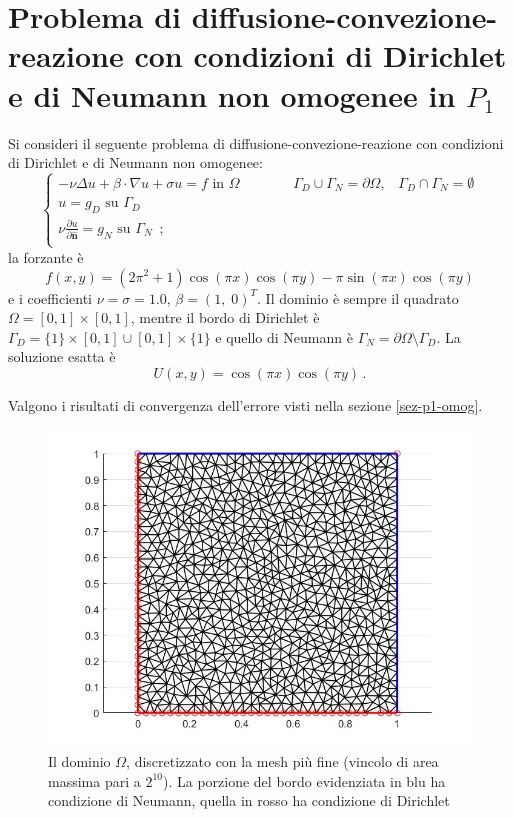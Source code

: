 \documentclass[%
	corpo=11pt,
    twoside,
    stile=classica,
    oldstyle,
    tipotesi=custom,
    greek,
    evenboxes,
]{toptesi}
\begin{document}
\section[Diffusione-convezione-reazione con condizioni di Dirichlet e  Neumann non omogenee in $P_1$]{Problema di diffusione-convezione-reazione con condizioni di Dirichlet e di Neumann non omogenee in $P_1$}

Si consideri il seguente problema di  diffusione-convezione-reazione con condizioni di Dirichlet e di Neumann non omogenee:
\[
\begin{cases}
-\nu\Delta u + \beta \cdot \nabla u + \sigma u = f \text{ in } \Omega \,\,\,\,\,\,\,\,\,\,\,\,\,\,\,\,\,\,\,\,\,\,\,\Gamma_D\cup\Gamma_N=\partial\Omega, \,\,\,\,\, \Gamma_D\cap\Gamma_N=\emptyset\\
u = g_D \text{ su } \Gamma_D\\
\nu \frac{\partial u}{\partial \hat{\textbf{n}}} = g_N \text{ su } \Gamma_N\,\,\,;\\
\end{cases}
\]
 la forzante è \[
 f(x, y) = (2\pi^2+1)\cos(\pi x)\cos(\pi y) - \pi \sin(\pi x)\cos(\pi y)
 \] e i coefficienti $\nu=\sigma=1.0$, $\beta = (1,\; 0)^T$. Il dominio è sempre il quadrato  $\Omega = [0, 1] \times [0, 1]$, mentre il bordo di Dirichlet è $\Gamma_D = \{1\}\times [0,1]\cup[0,1]\times\{1\}$  e quello di Neumann è $\Gamma_N=\partial\Omega\setminus\Gamma_D$.  La soluzione esatta  è \[
 U(x, y) = \cos(\pi x)\cos(\pi y)\,.
 \]

Valgono i risultati di convergenza dell'errore  visti nella sezione \ref{sez-p1-omog}.

\begin{figure}[htbp]
    \centering
    
    \includegraphics[scale=0.4]{Pictures/mesh_p1_neumann.jpg}
    \caption{Il dominio $\Omega$, discretizzato con la mesh più fine  (vincolo di area massima pari a $2^{10}$). La porzione del bordo evidenziata in blu ha condizione di Neumann, quella in rosso ha condizione di Dirichlet}
    \label{fig:mesh_neumann}
  
\end{figure}
\end{document}
